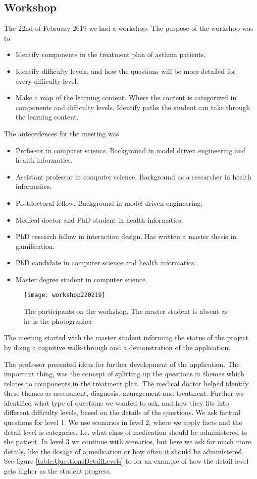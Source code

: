 \subsection{Workshop}
The 22nd of February 2019 we had a workshop. The purpose of the workshop was to
\begin{itemize}
	\item Identify components in the treatment plan of asthma patients.
	\item Identify difficulty levels, and how the questions will be more detailed for every difficulty level.
	\item Make a map of the learning content. Where the content is categorized in components and difficulty levels.  Identify paths the student can take through the learning content. 
\end{itemize}


The antecedences for the meeting was 
\begin{itemize}
	\item Professor in computer science. Background in model driven engineering and health informatics.
	\item Assistant professor in computer science. Background as a researcher in health informatics.
	\item Postdoctoral fellow. Background in model driven engineering.
	\item Medical doctor and PhD student in health informatics.
	\item PhD research fellow in interaction design. Has written a master thesis in gamification.
	\item PhD candidate in computer science and health informatics.
	\item Master degree student in computer science.	
\end{itemize}

\begin{figure}[h!]
	\texttt{[image: workshop220219]}
		\caption {The participants on the workshop. The master student is absent as he is the photographer}
\end{figure}

The meeting started with the master student informing the status of the project by doing a cognitive walk-through and a demonstration of the application. 

The professor presented ideas for further development of the application. The important thing, was the concept of splitting up the questions in themes which relates to components in the treatment plan. The medical doctor helped identify these themes as assessment, diagnosis, management and treatment. Further we identified what type of questions we wanted to ask, and how they fits into different difficulty levels, based on the details of the questions. We ask factual questions for level 1. We use scenarios in level 2, where we apply facts and the detail level is categories. I.e. what class of medication should be administered to the patient. In level 3 we continue with scenarios, but here we ask for much more details, like the dosage of a medication or how often it should be administered. See figure \ref{table:QuestionsDetailLevels} to for an example of how the detail level gets higher as the student progress.

